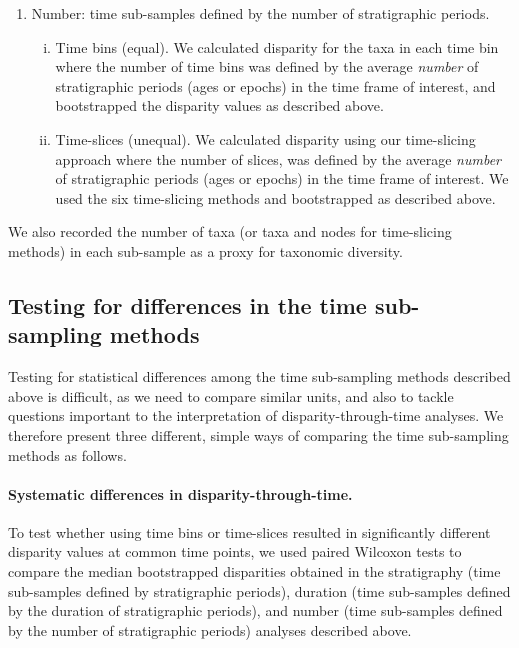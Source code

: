 \documentclass[12pt,a4paper]{article}
\begin{document}
\begin{enumerate}
  \item Number: time sub-samples defined by the number of stratigraphic periods. 
  \begin{enumerate}[(i)]
    \item Time bins (equal). 
    We calculated disparity for the taxa in each time bin where the number of time bins was defined by the average \textit{number} of stratigraphic periods (ages or epochs) in the time frame of interest, and bootstrapped the disparity values as described above.
    \item Time-slices (unequal).
    We calculated disparity using our time-slicing approach where the number of slices, was defined by the average \textit{number} of stratigraphic periods (ages or epochs) in the time frame of interest.
    We used the six time-slicing methods and bootstrapped as described above.
  \end{enumerate}


\end{enumerate}

We also recorded the number of taxa (or taxa and nodes for time-slicing methods) in each sub-sample as a proxy for taxonomic diversity. 

\subsection{Testing for differences in the time sub-sampling methods}
\label{testing}
Testing for statistical differences among the time sub-sampling methods described above is difficult, as we need to compare similar units, and also to tackle questions important to the interpretation of disparity-through-time analyses. 
We therefore present three different, simple ways of comparing the time sub-sampling methods as follows.

\paragraph{Systematic differences in disparity-through-time.} 
To test whether using time bins or time-slices resulted in significantly different disparity values at common time points, we used paired Wilcoxon tests to compare the median bootstrapped disparities obtained in the stratigraphy (time sub-samples defined by stratigraphic periods), duration (time sub-samples defined by the duration of stratigraphic periods), and number (time sub-samples defined by the number of stratigraphic periods) analyses described above.
\end{document}
